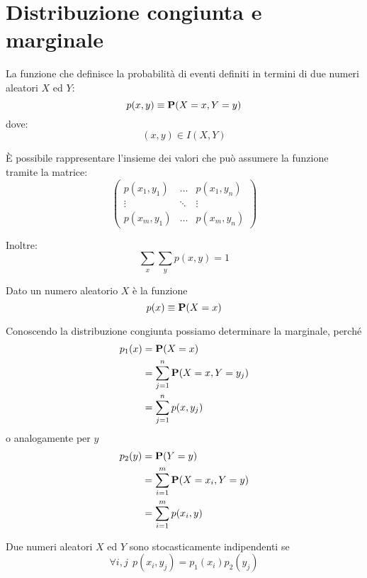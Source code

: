 
\section{Distribuzione congiunta e marginale} %
\begin{definition}
  \label{def:distribuzione_congiunta}
  La funzione che definisce la probabilità di eventi definiti in termini di due numeri aleatori \( X \) ed \( Y \):
  \[ p(x,y) \equiv \mathbf{P}(X = x, Y = y) \]
  dove:
  \[ (x,y) \in I(X,Y) \]
\end{definition}
È possibile rappresentare l'insieme dei valori che può assumere la funzione tramite la matrice:
\[
\begin{pmatrix}
  p(x_1, y_1) & \dots & p(x_1, y_n) \\
  \vdots & \ddots & \vdots \\
  p(x_m, y_1) & \dots & p(x_m, y_n)
\end{pmatrix}
\]

Inoltre:
\[ \sum_x \sum_y p(x,y) = 1 \]

\begin{definition}
  \label{def:distribuzione_marginale}
  Dato un numero aleatorio \( X \) è la funzione
  \[ p(x) \equiv \mathbf{P}(X = x) \]

  Conoscendo la distribuzione congiunta possiamo determinare la marginale, perché
  \begin{align*}
    p_1(x) &= \mathbf{P}(X = x) \\
    &= \sum_{j = 1}^n \mathbf{P}(X = x, Y = y_j) \\
    &= \sum_{j = 1}^n p(x, y_j)
  \end{align*}
  o analogamente per \( y \)
  \begin{align*}
    p_2(y) &= \mathbf{P}(Y = y) \\
    &= \sum_{i = 1}^m \mathbf{P}(X = x_i, Y = y) \\
    &= \sum_{i = 1}^m p(x_i, y)
  \end{align*}
\end{definition}

\begin{definition}
  Due numeri aleatori \( X \) ed \( Y \) sono stocasticamente indipendenti se
  \[ \forall i,j ~~ p(x_i, y_j) = p_1(x_i) p_2(y_j) \]
\end{definition}

